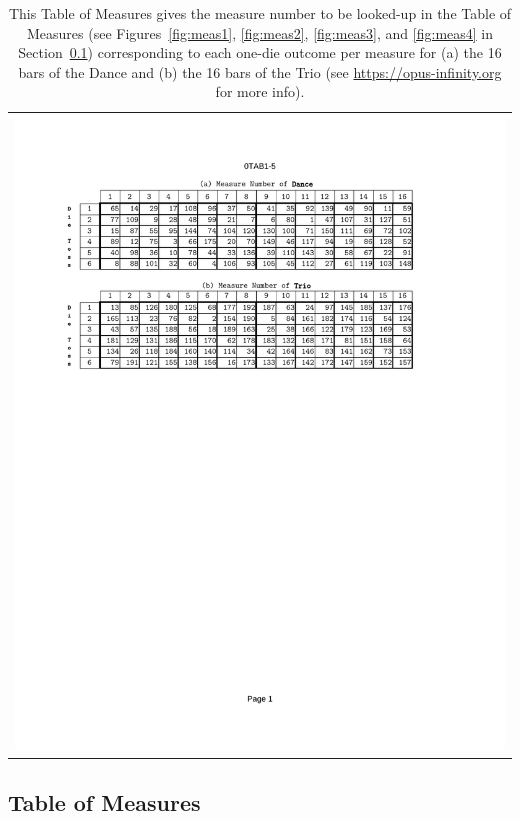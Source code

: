 \documentclass[a4paper,x11names,svgnames,10pt]{article}
\begin{document}
{\begin{table}[H]
	\centering
	\begin{tabular}{c}
		\centering
		\includegraphics[clip=true,trim=0.75in 6.50in 1.50in 1.10in,scale=0.90]{sd-TAB}
	\end{tabular}
	\caption{This Table of Measures gives the measure number to be looked-up in the Table of Measures (see Figures~\ref{fig:meas1}, \ref{fig:meas2}, \ref{fig:meas3}, and \ref{fig:meas4} in Section~\ref{tabMeas}) corresponding to each one-die outcome per measure for (a) the 16 bars of the Dance and (b) the 16 bars of the Trio (see  \href{https://opus-infinity.org/dice_games/gerlach_scottish_dance/tables/}{https://opus-infinity.org} for more info).}
	\label{fig:0tab1}
\end{table}


\subsection{Table of Measures}\label{tabMeas}

}
\end{document}

